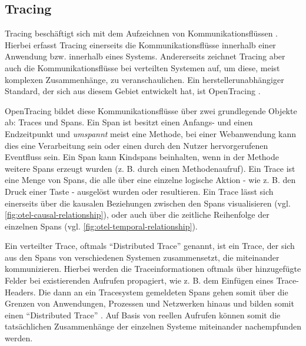
\subsection{Tracing}
\label{sec:tracing}

Tracing beschäftigt sich mit dem Aufzeichnen von Kommunikationsflüssen \cite{TowardsPerformanceToolingInteroperability}. Hierbei erfasst Tracing einerseits die Kommunikationsflüsse innerhalb einer Anwendung bzw. innerhalb eines Systems. Andererseits zeichnet Tracing aber auch die Kommunikationsflüsse bei verteilten Systemen auf, um diese, meist komplexen Zusammenhänge, zu veranschaulichen. Ein herstellerunabhängiger Standard, der sich aus diesem Gebiet entwickelt hat, ist OpenTracing \cite{OpenTracing}.

OpenTracing bildet diese Kommunikationsflüsse über zwei grundlegende Objekte ab: Traces und Spans. Ein Span ist besitzt einen Anfangs- und einen Endzeitpunkt und \textit{umspannt} meist eine Methode, bei einer Webanwendung kann dies eine Verarbeitung sein oder einen durch den Nutzer hervorgerufenen Eventfluss sein. Ein Span kann Kindspans beinhalten, wenn in der Methode weitere Spans erzeugt wurden (z. B. durch einen Methodenaufruf). Ein Trace ist eine Menge von Spans, die alle über eine einzelne logische Aktion - wie z. B. den Druck einer Taste - ausgelöst wurden oder resultieren. Ein Trace lässt sich einerseits über die kausalen Beziehungen zwischen den Spans visualisieren (vgl. \autoref{fig:otel-causal-relationship}), oder auch über die zeitliche Reihenfolge der einzelnen Spans (vgl. \autoref{fig:otel-temporal-relationship}).

Ein verteilter Trace, oftmals \enquote{Distributed Trace} genannt, ist ein Trace, der sich aus den Spans von verschiedenen Systemen zusammensetzt, die miteinander kommunizieren. Hierbei werden die Traceinformationen oftmals über hinzugefügte Felder bei existierenden Aufrufen propagiert, wie z. B. dem Einfügen eines Trace-Headers. Die dann an ein Tracesystem gemeldeten Spans gehen somit über die Grenzen von Anwendungen, Prozessen und Netzwerken hinaus und bilden somit einen \enquote{Distributed Trace} \cite{OpenTracingSpecification}. Auf Basis von reellen Aufrufen können somit die tatsächlichen Zusammenhänge der einzelnen Systeme miteinander nachempfunden werden.

